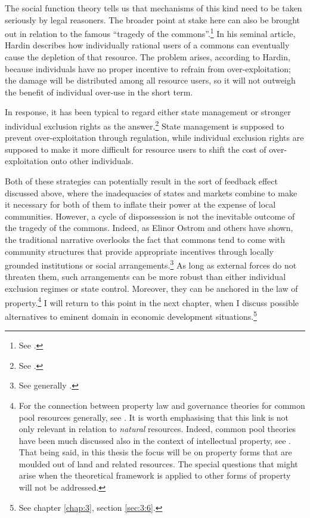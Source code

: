 The social function theory tells us that mechanisms of this kind need to be taken seriously by legal reasoners. The broader point at stake here can also be brought out in relation to the famous ``tragedy of the commons''.\footnote{See \cite{hardin68}.} In his seminal article, Hardin describes how individually rational users of a commons can eventually cause the depletion of that resource. The problem arises, according to Hardin, because individuals have no proper incentive to refrain from over-exploitation; the damage will be distributed among all resource users, so it will not outweigh the benefit of individual over-use in the short term.


In response, it has been typical to regard either state management or stronger individual exclusion rights as the answer.\footnote{See \cite[8-13]{ostrom90}.} State management is supposed to prevent over-exploitation through regulation, while individual exclusion rights are supposed to make it more difficult for resource users to shift the cost of over-exploitation onto other individuals.

Both of these strategies can potentially result in the sort of feedback effect discussed above, where the inadequacies of states and markets combine to make it necessary for both of them to inflate their power at the expense of local communities. However, a cycle of dispossession is not the inevitable outcome of the tragedy of the commons. Indeed, as Elinor Ostrom and others have shown, the traditional narrative overlooks the fact that commons tend to come with community structures that provide appropriate incentives through locally grounded institutions or social arrangements.\footnote{See generally \cite{ostrom90}.} As long as external forces do not threaten them, such arrangements can be more robust than either 
individual exclusion regimes or state control. Moreover, they can be anchored in the law of property.\footnote{For the connection between property law and governance theories for common pool resources generally, see \cite{rose11,fennel11}. It is worth emphasising that this link is not only relevant in relation to {\it natural} resources. Indeed, common pool theories have been much discussed also in the context of intellectual property, see \cite[38-43]{rose11}. That being said, in this thesis the focus will be on property forms that are moulded out of land and related resources. The special questions that might arise when the theoretical framework is applied to other forms of property will not be addressed.} I will return to this point in the next chapter, when I discuss possible alternatives to eminent domain in economic development situations.\footnote{See chapter \ref{chap:3}, section \ref{sec:3:6}.}

